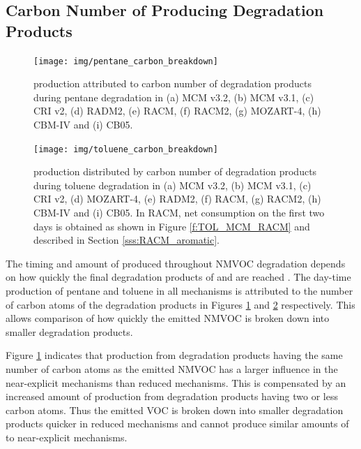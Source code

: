 
\subsection{Carbon Number of  Producing Degradation Products} \label{ss:c_number} %

\begin{figure}
    \begin{center}
        \texttt{[image: img/pentane\_carbon\_breakdown]}
    \end{center}
    \caption{ production attributed to carbon number of degradation products during pentane degradation in (a) MCM v3.2, (b) MCM v3.1, (c) CRI v2, (d) RADM2, (e) RACM, (f) RACM2, (g) MOZART-4, (h) CBM-IV and (i) CB05.}
    \label{f:pentane_carbon}
\end{figure}

\begin{figure}
    \begin{center}
        \texttt{[image: img/toluene\_carbon\_breakdown]}
    \end{center}
    \caption{ production distributed by carbon number of degradation products during toluene degradation in (a) MCM v3.2, (b) MCM v3.1, (c) CRI v2, (d) MOZART-4, (e) RADM2, (f) RACM, (g) RACM2, (h) CBM-IV and (i) CB05. In RACM, net  consumption on the first two days is obtained as shown in Figure \ref{f:TOL_MCM_RACM} and described in Section \ref{sss:RACM_aromatic}.}
    \label{f:toluene_carbon}
\end{figure}

The timing and amount of  produced throughout NMVOC degradation depends on how quickly the final degradation products of  and  are reached \citep{Butler:2011}. 
The day-time  production of pentane and toluene in all mechanisms is attributed to the number of carbon atoms of the degradation products in Figures \ref{f:pentane_carbon} and \ref{f:toluene_carbon} respectively. 
This allows comparison of how quickly the emitted NMVOC is broken down into smaller degradation products.

Figure \ref{f:pentane_carbon} indicates that  production from degradation products having the same number of carbon atoms as the emitted NMVOC has a larger influence in the near-explicit mechanisms than reduced mechanisms. 
This is compensated by an increased amount of  production from degradation products having two or less carbon atoms. 
Thus the emitted VOC is broken down into smaller degradation products quicker in reduced mechanisms and cannot produce similar amounts of  to near-explicit mechanisms.


